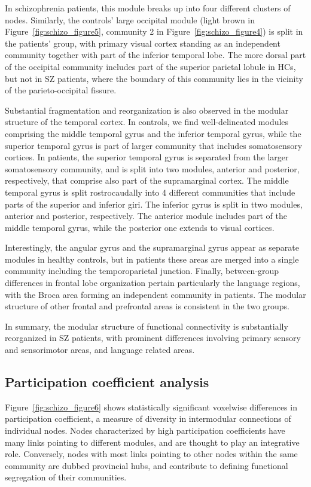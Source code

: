 In schizophrenia patients, this module breaks up into four different clusters of nodes.
Similarly, the controls' large occipital module (light brown in Figure~\ref{fig:schizo_figure5}, community 2 in Figure~\ref{fig:schizo_figure4}) is split in the patients' group, with primary visual cortex standing as an independent community together with part of the inferior temporal lobe.
The more dorsal part of the occipital community includes part of the superior parietal lobule in HCs, but not in SZ patients, where the boundary of this community lies in the vicinity of the parieto-occipital fissure.

Substantial fragmentation and reorganization is also observed in the modular structure of the temporal cortex.
In controls, we find well-delineated modules comprising the middle temporal gyrus and the inferior temporal gyrus, while the superior temporal gyrus is part of larger community that includes somatosensory cortices.
In patients, the superior temporal gyrus is separated from the larger somatosensory community, and is split into two modules, anterior and posterior, respectively, that comprise also part of the supramarginal cortex.
The middle temporal gyrus is split rostrocaudally into 4 different communities that include parts of the superior and inferior giri.
The inferior gyrus is split in ttwo modules, anterior and posterior, respectively.
The anterior module includes part of the middle temporal gyrus, while the posterior one extends to visual cortices. 

Interestingly, the angular gyrus and the supramarginal gyrus appear as separate modules in healthy controls, but in patients these areas are merged into a single community including the temporoparietal junction. 
Finally, between-group differences in frontal lobe organization pertain particularly the language regions, with the Broca area forming an independent community in patients.
The modular structure of other frontal and prefrontal areas is consistent in the two groups.

In summary, the modular structure of functional connectivity is substantially reorganized in SZ patients, with prominent differences involving primary sensory and sensorimotor areas, and language related areas. 

\subsection{Participation coefficient analysis}
Figure~\ref{fig:schizo_figure6} shows statistically significant voxelwise differences in participation coefficient, a measure of diversity in intermodular connections of individual nodes.
Nodes characterized by high participation coefficients have many links pointing to different modules, and are thought to play an integrative role. 
Conversely, nodes with most links pointing to other nodes within the same community are dubbed provincial hubs, and contribute to defining functional segregation of their communities.

